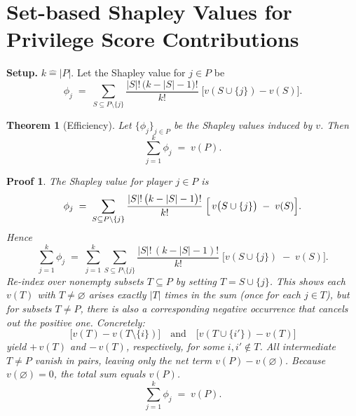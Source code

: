 \documentclass{article}
\begin{document}
\newtheorem{theorem}{Theorem}
\newtheorem{proof_sketch}{Proof}
\newtheorem{proofsketch}{Proof (Step-by-Step)}

\section*{Set-based Shapley Values for Privilege Score Contributions}

\textbf{Setup.} 
$k \hat{=} |P|$. Let the Shapley value for $j \in P$ be
\[
\phi_j \;=\;
\sum_{S \subseteq P \setminus \{j\}}
\frac{|S|!\,\bigl(k - |S| -1\bigr)!}{k!}
\;
\bigl[v(S \cup \{j\}) - v(S)\bigr].
\]

\begin{theorem}[Efficiency]
Let $\{\phi_j\}_{j \in P}$ be the Shapley values induced by $v$. Then
\[
\sum_{j=1}^k \phi_j
\;=\;
v(P).
\]
\end{theorem}

\begin{proof_sketch}
The Shapley value for player $j \in P$ is 
\[
\phi_j 
\;=\;
\sum_{S \subseteq P \setminus \{j\}}
\frac{|S|!\,\bigl(k - |S| - 1\bigr)!}{k!}
\;\Bigl[\,v\bigl(S \cup \{j\}\bigr) \;-\; v(S)\Bigr].
\]
Hence
\[
\sum_{j=1}^k \phi_j
\;=\;
\sum_{j=1}^k
\sum_{S \subseteq P \setminus \{j\}}
\frac{|S|!\,(k - |S| - 1)!}{k!}
\;\bigl[v(S \cup \{j\}) \;-\; v(S)\bigr].
\]
Re-index over nonempty subsets $T \subseteq P$ by setting $T = S \cup \{j\}$. This shows each $v(T)$ with $T\neq \varnothing$ arises exactly $|T|$ times in the sum (once for each $j \in T$), but for subsets $T \neq P$, there is also a corresponding negative occurrence that cancels out the positive one. Concretely:
\[
\bigl[v(T) - v(T \setminus \{i\})\bigr]
\quad \text{and} \quad
\bigl[v(T \cup \{i'\}) - v(T)\bigr]
\]
yield $+\,v(T)$ and $-\,v(T)$, respectively, for some $i,i'\notin T$. 
All intermediate $T \neq P$ vanish in pairs, leaving only the net term $v(P) - v(\varnothing)$. Because $v(\varnothing)=0$, the total sum equals $v(P)$. 
\[
\sum_{j=1}^k \phi_j \;=\; v(P).
\]
\end{proof_sketch}
\end{document}
